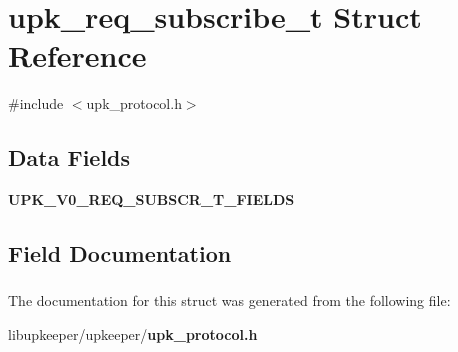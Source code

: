 \section{upk\_\-req\_\-subscribe\_\-t Struct Reference}
\label{structupk__req__subscribe__t}


{\ttfamily \#include $<$upk\_\-protocol.h$>$}

\subsection*{Data Fields}
\begin{DoxyCompactItemize}
\item 
{\bf UPK\_\-V0\_\-REQ\_\-SUBSCR\_\-T\_\-FIELDS}
\end{DoxyCompactItemize}


\subsection{Field Documentation}
\subsubsection[{UPK\_\-V0\_\-REQ\_\-SUBSCR\_\-T\_\-FIELDS}]{}\label{structupk__req__subscribe__t_a750774bdb4b4f21e3229dc5ecf6ccadd}


The documentation for this struct was generated from the following file:\begin{DoxyCompactItemize}
\item 
libupkeeper/upkeeper/{\bf upk\_\-protocol.h}\end{DoxyCompactItemize}
